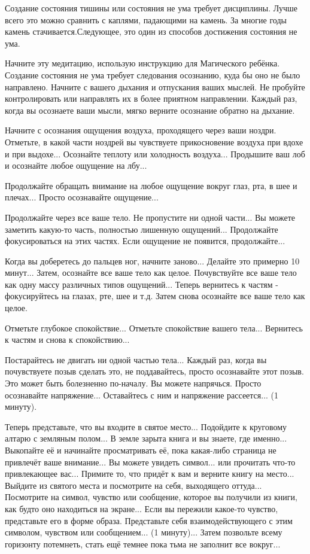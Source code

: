 \documentclass[10pt, fleqn]{article}
\begin{document}
Создание состояния тишины или состояния не ума требует дисциплины. Лучше всего это можно сравнить с каплями, падающими на камень. За многие годы камень стачивается.Следующее, это один из способов достижения состояния не ума.

Начните эту медитацию, использую инструкцию для Магического ребёнка. Создание состояния не ума требует следования осознанию, куда бы оно не было направлено. Начните с вашего дыхания и отпускания ваших мыслей. Не пробуйте контролировать или направлять их в более приятном направлении. Каждый раз, когда вы осознаете ваши мысли, мягко верните осознание обратно на дыхание.

Начните с осознания ощущения воздуха, проходящего через ваши ноздри. Отметьте, в какой части ноздрей вы чувствуете прикосновение воздуха при вдохе и при выдохе... Осознайте теплоту или холодность воздуха... Продышите ваш лоб и осознайте любое ощущение на лбу...

Продолжайте обращать внимание на любое ощущение вокруг глаз, рта, в шее и плечах... Просто осознавайте ощущение...

Продолжайте через все ваше тело. Не пропустите ни одной части... Вы можете заметить какую-то часть, полностью лишенную ощущений... Продолжайте фокусироваться на этих частях. Если ощущение не появится, продолжайте...

Когда вы доберетесь до пальцев ног, начните заново... Делайте это примерно 10 минут... Затем, осознайте все ваше тело как целое. Почувствуйте все ваше тело как одну массу различных типов ощущений... Теперь вернитесь к частям - фокусируйтесь на глазах, рте, шее и т.д. Затем снова осознайте все ваше тело как целое.

Отметьте глубокое спокойствие... Отметьте спокойствие вашего тела... Вернитесь к частям и снова к спокойствию...

Постарайтесь не двигать ни одной частью тела... Каждый раз, когда вы почувствуете позыв сделать это, не поддавайтесь, просто осознавайте этот позыв. Это может быть болезненно по-началу. Вы можете напрячься. Просто осознавайте напряжение... Оставайтесь с ним и напряжение рассеется... (1 минуту).

Теперь представьте, что вы входите в святое место... Подойдите к круговому алтарю с земляным полом... В земле зарыта книга и вы знаете, где именно... Выкопайте её и начинайте просматривать её, пока какая-либо страница не привлечёт ваше внимание... Вы можете увидеть символ... или прочитать что-то привлекающее вас... Примите то, что придёт к вам и верните книгу на место... Выйдите из святого места и посмотрите на себя, выходящего оттуда... Посмотрите на символ, чувство или сообщение, которое вы получили из книги, как будто оно находиться на экране... Если вы пережили какое-то чувство, представьте его в форме образа. Представьте себя взаимодействующего с этим символом, чувством или сообщением... (1 минуту)... Затем позвольте всему горизонту потемнеть, стать ещё темнее пока тьма не заполнит все вокруг...
\end{document}
